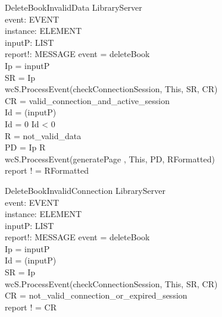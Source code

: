 \begin{schema}{DeleteBookInvalidData}
\Delta LibraryServer \\
event: EVENT \\
instance: ELEMENT \\
inputP: LIST \\
report!: MESSAGE
\where event = deleteBook \\
Ip = \head inputP \\
SR = \lseq Ip \rseq \\ 
wcS.ProcessEvent(checkConnectionSession, This, SR, CR) \\
CR = valid\_connection\_and\_active\_session \\
Id = \head (\tail inputP) \\
Id = 0 \lor Id < 0 \\
R = not\_valid\_data \\
PD = \lseq Ip R \rseq \\
wcS.ProcessEvent(generatePage , This, PD, RFormatted) \\
report ! = RFormatted
\end{schema}


\begin{schema}{DeleteBookInvalidConnection}
\Delta LibraryServer \\
event: EVENT \\
instance: ELEMENT \\
inputP: LIST \\
report!: MESSAGE
\where event = deleteBook \\
Ip = \head inputP \\
Id = \head (\tail inputP) \\
SR = \lseq Ip \rseq \\ 
wcS.ProcessEvent(checkConnectionSession, This, SR, CR) \\
CR = not\_valid\_connection\_or\_expired\_session \\ 
report ! = CR
\end{schema}

